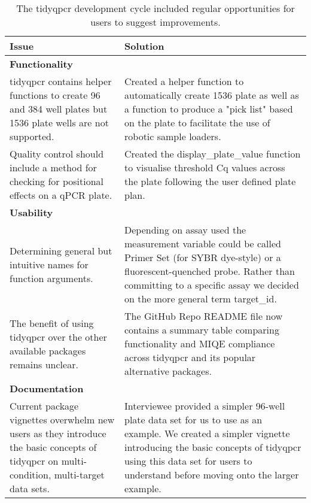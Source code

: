 \documentclass[../main.tex]{subfiles}
\begin{document}
\begin{table}
    \def\arraystretch{1.25}
\centering
\begin{tabular}{|| m{4.5cm} | m{7cm} ||} 
 \hline
 \textbf{\large Issue} & \textbf{\large Solution} \\ [0.5ex] 
 \hline\hline
 \multicolumn{2}{|l|}{\textbf{Functionality}} \\
 \hline
 tidyqpcr contains helper functions to create 96 and 384 well plates but 1536 plate wells are not supported. & 
 Created a helper function to automatically create 1536 plate as well as a function to produce a "pick list" based on the plate to facilitate the use of robotic sample loaders. \\ 
 \hline
 Quality control should include a method for checking for positional effects on a qPCR plate. & 
 Created the display\_plate\_value function to visualise threshold Cq values across the plate following the user defined plate plan. \\
 \hline
 \multicolumn{2}{|l|}{\textbf{Usability}} \\
 \hline
 Determining general but intuitive names for function arguments. & 
 Depending on assay used the measurement variable could be called Primer Set (for SYBR dye-style) or a fluorescent-quenched probe. 
 Rather than committing to a specific assay we decided on the more general term target\_id. \\
 \hline
 The benefit of using tidyqpcr over the other available packages remains unclear. & 
 The GitHub Repo README file now contains a summary table comparing functionality and MIQE compliance across tidyqpcr and its popular alternative packages.\\
 \hline
 \multicolumn{2}{|l|}{\textbf{Documentation}} \\
 \hline
 Current package vignettes overwhelm new users as they introduce the basic concepts of tidyqpcr on multi-condition, multi-target data sets. & 
 Interviewee provided a simpler 96-well plate data set for us to use as an example. 
 We created a simpler vignette introducing the basic concepts of tidyqpcr using this data set for users to understand before moving onto the larger example. \\
 \hline
\end{tabular}
\caption[tidyqpcr's development included improvements  from user feedback.]{The tidyqpcr development cycle included regular opportunities for users to suggest improvements.}
\label{user-feedback}
\end{table}
\end{document}
